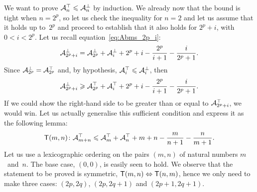 We want to prove \(\mathcal{A}_{n}^{\top} \leqslant \mathcal{A}_{n}^{\bot}\) by
induction. We already now that the bound is tight when \(n=2^p\), so
let us check the inequality for \(n=2\) and let us assume that it
holds up to~\(2^p\) and proceed to establish that it also holds for
\(2^p+i\), with \(0 < i < 2^p\). Let us recall
equation~\eqref{eq:Abms_2p_i}:
\begin{equation*}
\mathcal{A}_{2^p+i}^{\bot} = \mathcal{A}_{2^p}^{\bot} + \mathcal{A}_{i}^{\bot}
+ 2^p + i - \frac{2^p}{i+1} - \frac{i}{2^p+1}.
\end{equation*}
Since \(\mathcal{A}_{2^p}^{\bot} = \mathcal{A}_{2^p}^{\top}\) and, by
hypothesis, \(\mathcal{A}_{i}^{\top} \leqslant \mathcal{A}_{i}^{\bot}\), then
\begin{equation}
\mathcal{A}_{2^p+i}^{\bot} \geqslant \mathcal{A}_{2^p}^{\top} + \mathcal{A}_{i}^{\top}
+ 2^p + i - \frac{2^p}{i+1} - \frac{i}{2^p+1}.
\label{ineq:Atms_Abms}
\end{equation}
If we could show the right-hand side to be greater than or equal
to \(\mathcal{A}_{2^p+i}^{\top}\), we would win. Let us actually generalise
this sufficient condition and express it as the following lemma:
\begin{equation*}
  \textsf{T}({m,n}) \colon
  \mathcal{A}_{m+n}^{\top} \leqslant \mathcal{A}_{m}^{\top} + \mathcal{A}_{n}^{\top} +
  m + n - \frac{m}{n+1} - \frac{n}{m+1}.
\end{equation*}
Let us use a lexicographic ordering on the pairs \((m,n)\) of natural
numbers \(m\)~and~\(n\). The base case, \((0,0)\), is easily seen to
hold. We observe that the statement to be proved is symmetric,
\(\textsf{T}({m,n}) \Leftrightarrow \textsf{T}({n,m})\), hence we only need to
make three cases: \((2p,2q)\), \((2p,2q+1)\) and \((2p+1,2q+1)\).
